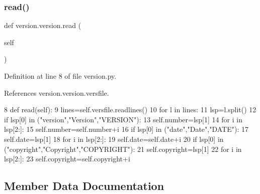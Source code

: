\subsubsection{\texorpdfstring{read()}{read()}}
{\footnotesize\ttfamily def version.\+version.\+read (\begin{DoxyParamCaption}\item[{}]{self }\end{DoxyParamCaption})}



Definition at line 8 of file version.\+py.



References version.\+version.\+versfile.


\begin{DoxyCode}
8     \textcolor{keyword}{def }read(self):
9         lines=self.versfile.readlines()
10         \textcolor{keywordflow}{for} l \textcolor{keywordflow}{in} lines:
11             lsp=l.split()
12             \textcolor{keywordflow}{if} lsp[0] \textcolor{keywordflow}{in} (\textcolor{stringliteral}{"version"},\textcolor{stringliteral}{"Version"},\textcolor{stringliteral}{"VERSION"}):
13                 self.number=lsp[1]
14                 \textcolor{keywordflow}{for} i \textcolor{keywordflow}{in} lsp[2:]:
15                     self.number=self.number+i
16             \textcolor{keywordflow}{if} lsp[0] \textcolor{keywordflow}{in} (\textcolor{stringliteral}{"date"},\textcolor{stringliteral}{"Date"},\textcolor{stringliteral}{"DATE"}):
17                 self.date=lsp[1]
18                 \textcolor{keywordflow}{for} i \textcolor{keywordflow}{in} lsp[2:]:
19                     self.date=self.date+i
20             \textcolor{keywordflow}{if} lsp[0] \textcolor{keywordflow}{in} (\textcolor{stringliteral}{"copyright"},\textcolor{stringliteral}{"Copyright"},\textcolor{stringliteral}{"COPYRIGHT"}):
21                 self.copyright=lsp[1]
22                 \textcolor{keywordflow}{for} i \textcolor{keywordflow}{in} lsp[2:]:
23                     self.copyright=self.copyright+i
\end{DoxyCode}


\subsection{Member Data Documentation}
\mbox{\label{classversion_1_1version_a917f6a98ea7478ddbb874d3aff79a1c9}} 
